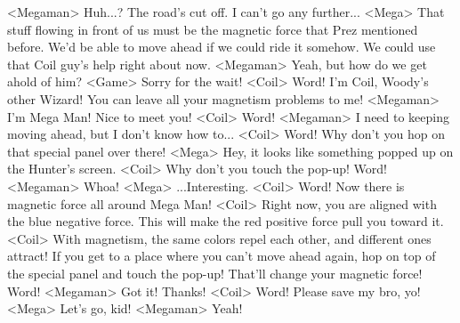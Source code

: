<Megaman> Huh...? The road's cut off. I can't go any further... 
<Mega> That stuff flowing in front of us must be the 
magnetic force that Prez mentioned before. 
We'd be able to move ahead if we could ride it somehow. 
We could use that Coil guy's help right about now. 
<Megaman> Yeah, but how do we get ahold of him? 
<Game> Sorry for the wait! 
<Coil> Word! I'm Coil, Woody's other Wizard! 
You can leave all your magnetism problems to me! 
<Megaman> I'm Mega Man! Nice to meet you! 
<Coil> Word! 
<Megaman> I need to keeping moving ahead, but I don't know how to... 
<Coil> Word! Why don't you hop on that special panel over there! 
<Mega> Hey, it looks like something popped up on the Hunter's screen. 
<Coil> Why don't you touch the pop-up! Word! 
<Megaman> Whoa! 
<Mega> ...Interesting. 
<Coil> Word! Now there is magnetic force all around Mega Man! 
<Coil> Right now, you are aligned with the blue negative force. 
This will make the red positive force pull you toward it. 
<Coil> With magnetism, the same colors repel each other, and different ones attract! 
If you get to a place where you can't move ahead again, hop on top 
of the special panel and touch the pop-up! 
That'll change your magnetic force! Word! 
<Megaman> Got it! Thanks! 
<Coil> Word! Please save my bro, yo! 
<Mega> Let's go, kid! 
<Megaman> Yeah! 
